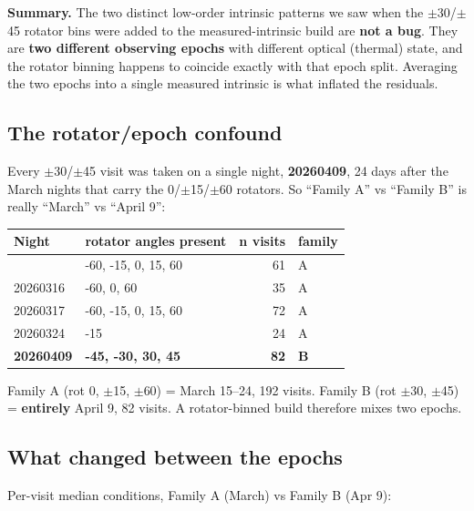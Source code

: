 \textbf{Summary.} The two distinct low-order intrinsic patterns we saw
when the $\pm$30/$\pm$45 rotator bins were added to the measured-intrinsic build
are \textbf{not a bug}. They are \textbf{two different observing epochs}
with different optical (thermal) state, and the rotator binning happens
to coincide exactly with that epoch split. Averaging the two epochs into
a single measured intrinsic is what inflated the residuals.

\subsection{The rotator/epoch confound}\label{the-rotatorepoch-confound}

Every $\pm$30/$\pm$45 visit was taken on a single night, \textbf{20260409}, 24
days after the March nights that carry the 0/$\pm$15/$\pm$60 rotators. So
``Family A'' vs ``Family B'' is really ``March'' vs ``April 9'':

{ %
\begin{longtable}[]{@{}llrl@{}}
\toprule\noalign{}
Night & rotator angles present & n visits & family \\
\midrule\noalign{}
\endhead
\bottomrule\noalign{}
\endlastfoot
20260315 & -60, -15, 0, 15, 60 & 61 & A \\
20260316 & -60, 0, 60 & 35 & A \\
20260317 & -60, -15, 0, 15, 60 & 72 & A \\
20260324 & -15 & 24 & A \\
\textbf{20260409} & \textbf{-45, -30, 30, 45} & \textbf{82} &
\textbf{B} \\
\end{longtable}
}

Family A (rot 0, $\pm$15, $\pm$60) = March 15--24, 192 visits. Family B (rot
$\pm$30, $\pm$45) = \textbf{entirely} April 9, 82 visits. A rotator-binned build
therefore mixes two epochs.

\subsection{What changed between the
epochs}\label{what-changed-between-the-epochs}

Per-visit median conditions, Family A (March) vs Family B (Apr 9):

